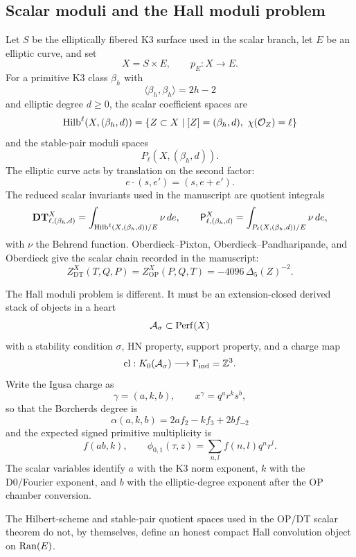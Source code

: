 \subsection{Scalar moduli and the Hall moduli problem}

Let \(S\) be the elliptically fibered K3 surface used in the scalar
branch, let \(E\) be an elliptic curve, and set
\[
X=S\times E,\qquad p_E:X\longrightarrow E.
\]
For a primitive K3 class \(\beta_h\) with
\[
\langle\beta_h,\beta_h\rangle=2h-2
\]
and elliptic degree \(d\ge0\), the scalar coefficient spaces are
\[
\operatorname{Hilb}^\ell(X,(\beta_h,d))
=\{Z\subset X\mid [Z]=(\beta_h,d),\ \chi(\mathcal O_Z)=\ell\}
\]
and the stable-pair moduli spaces
\[
P_\ell(X,(\beta_h,d)).
\]
The elliptic curve acts by translation on the second factor:
\[
e\cdot(s,e')=(s,e+e').
\]
The reduced scalar invariants used in the manuscript are quotient
integrals
\[
\mathbf{DT}^{X}_{\ell,(\beta_h,d)}
=\int_{\operatorname{Hilb}^\ell(X,(\beta_h,d))/E}\nu\,de,
\qquad
\mathsf P^{X}_{\ell,(\beta_h,d)}
=\int_{P_\ell(X,(\beta_h,d))/E}\nu\,de,
\]
with \(\nu\) the Behrend function.  Oberdieck--Pixton,
Oberdieck--Pandharipande, and Oberdieck give the scalar chain recorded in
the manuscript:
\[
Z^X_{\mathrm{DT}}(T,Q,P)=Z^X_{\mathrm{OP}}(P,Q,T)
=-4096\,\Delta_5(Z)^{-2}.
\]

The Hall moduli problem is different.  It must be an extension-closed
derived stack of objects in a heart
\[
\mathcal A_\sigma\subset \operatorname{Perf}(X)
\]
with a stability condition \(\sigma\), HN property, support property, and
a charge map
\[
\operatorname{cl}:K_0(\mathcal A_\sigma)\longrightarrow
\Gamma_{\mathrm{ind}}=\mathbb Z^3.
\]
Write the Igusa charge as
\[
\gamma=(a,k,b),\qquad x^\gamma=q^a r^k s^b,
\]
so that the Borcherds degree is
\[
\alpha(a,k,b)=2a f_2-k f_3+2b f_{-2}
\]
and the expected signed primitive multiplicity is
\[
f(ab,k),\qquad
\phi_{0,1}(\tau,z)=\sum_{n,l}f(n,l)q^n r^l.
\]
The scalar variables identify \(a\) with the K3 norm exponent,
\(k\) with the D0/Fourier exponent, and \(b\) with the elliptic-degree
exponent after the OP chamber conversion.

\begin{proposition}
\label{prop:scalar-spaces-not-ranE-hall}
The Hilbert-scheme and stable-pair quotient spaces used in the OP/DT
scalar theorem do not, by themselves, define an honest compact Hall
convolution object on \(\operatorname{Ran}(E)\).
\end{proposition}

